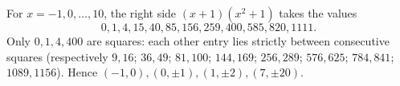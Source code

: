 For $x=-1,0,\ldots,10$, the right side $(x+1)(x^2+1)$ takes the values
\[
0,1,4,15,40,85,156,259,400,585,820,1111.
\]
Only $0,1,4,400$ are squares: each other entry lies strictly between consecutive squares (respectively $9,16$; $36,49$; $81,100$; $144,169$; $256,289$; $576,625$; $784,841$; $1089,1156$).
Hence $\boxed{(-1,0),(0,\pm1),(1,\pm2),(7,\pm20)}$.
